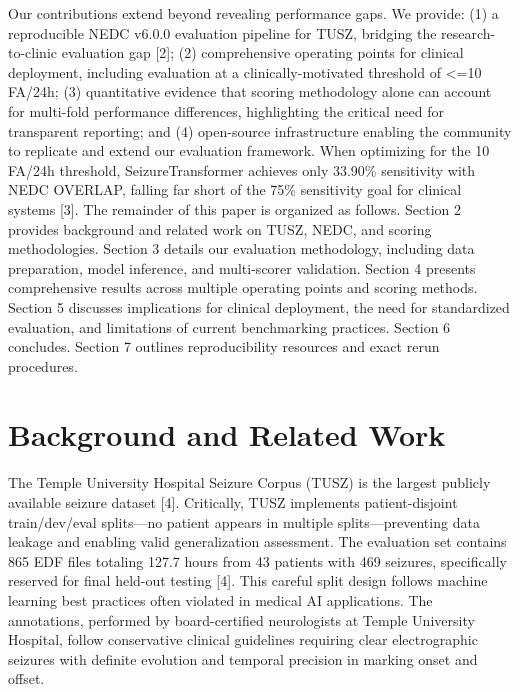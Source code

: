 Our contributions extend beyond revealing performance gaps. We provide:
(1) a reproducible NEDC v6.0.0 evaluation pipeline for TUSZ, bridging
the research-to-clinic evaluation gap {[}2{]}; (2) comprehensive
operating points for clinical deployment, including evaluation at a
clinically-motivated threshold of \textless=10 FA/24h; (3) quantitative
evidence that scoring methodology alone can account for multi-fold
performance differences, highlighting the critical need for transparent
reporting; and (4) open-source infrastructure enabling the community to
replicate and extend our evaluation framework. When optimizing for the
10 FA/24h threshold, SeizureTransformer achieves only 33.90\%
sensitivity with NEDC OVERLAP, falling far short of the 75\% sensitivity
goal for clinical systems {[}3{]}. The remainder of this paper is
organized as follows. Section 2 provides background and related work on
TUSZ, NEDC, and scoring methodologies. Section 3 details our evaluation
methodology, including data preparation, model inference, and
multi-scorer validation. Section 4 presents comprehensive results across
multiple operating points and scoring methods. Section 5 discusses
implications for clinical deployment, the need for standardized
evaluation, and limitations of current benchmarking practices. Section 6
concludes. Section 7 outlines reproducibility resources and exact rerun
procedures.

\hypertarget{background-and-related-work}{%
\section{Background and Related
Work}\label{background-and-related-work}}

The Temple University Hospital Seizure Corpus (TUSZ) is the largest
publicly available seizure dataset {[}4{]}. Critically, TUSZ implements
patient-disjoint train/dev/eval splits---no patient appears in multiple
splits---preventing data leakage and enabling valid generalization
assessment. The evaluation set contains 865 EDF files totaling 127.7
hours from 43 patients with 469 seizures, specifically reserved for
final held-out testing {[}4{]}. This careful split design follows
machine learning best practices often violated in medical AI
applications. The annotations, performed by board-certified neurologists
at Temple University Hospital, follow conservative clinical guidelines
requiring clear electrographic seizures with definite evolution and
temporal precision in marking onset and offset.

